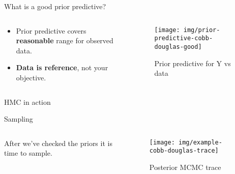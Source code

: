 \documentclass{beamer}
\begin{document}
\begin{frame}{What is a good prior predictive?}
\begin{columns}
\begin{column}{0.6\linewidth}
\begin{itemize}
    \item Prior predictive covers \textbf{reasonable} range for observed data.
    \item \textbf{Data is reference}, not your objective.
\end{itemize}
\end{column}
\begin{column}{0.4\linewidth}
\begin{figure}
    \centering
    \texttt{[image: img/prior-predictive-cobb-douglas-good]}
    \caption{Prior predictive for Y vs data}
\end{figure}
\end{column}
\end{columns}
\end{frame}
\begin{frame}{HMC in action}
    
\end{frame}
\begin{frame}{Sampling}
\begin{columns}
\begin{column}{0.3\linewidth}
After we've checked the priors it is time to sample.
\end{column}
\begin{column}{0.7\linewidth}
\begin{figure}
    \centering
    \texttt{[image: img/example-cobb-douglas-trace]}
    \caption{Posterior MCMC trace}
\end{figure}
\end{column}
\end{columns}
\end{frame}
\end{document}
